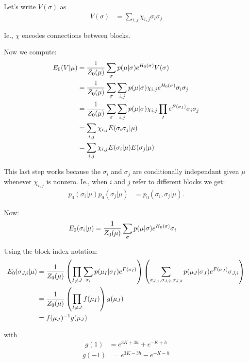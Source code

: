 \documentclass[11pt]{article}
\begin{document}
Let's write $V(\sigma)$ as
\begin{align*}
V(\sigma) &= \sum_{i,j} \chi_{i,j}\sigma_{i}\sigma_{j}
\end{align*}

Ie., $\chi$ encodes connections between blocks.

Now we compute:
\begin{align*}
E_{0}(V | \mu) &= {{1} \over {Z_{0}(\mu)}}\sum_{\sigma} p(\mu | \sigma)e^{H_{0}(\sigma)}V(\sigma)\\
 &= {{1} \over {Z_{0}(\mu)}}\sum_{\sigma} \sum_{i,j} p(\mu | \sigma)\chi_{i,j}e^{H_{0}(\sigma)}\sigma_{i}\sigma_{j}\\
 &= {{1} \over {Z_{0}(\mu)}}\sum_{\sigma} \sum_{i,j} p(\mu | \sigma)\chi_{i,j}\prod_{I} e^{F(\sigma_{I})}\sigma_{i}\sigma_{j}\\
 &= \sum_{i,j} \chi_{i,j}E(\sigma_{i}\sigma_{j} | \mu)\\
 &= \sum_{i,j} \chi_{i,j}E(\sigma_{i} | \mu)E(\sigma_{j} | \mu)
\end{align*}

This last step works because the $\sigma_i$ and $\sigma_j$ are
conditionally independant given $\mu$ whenever $\chi_{i, j}$ is
nonzero. Ie., when $i$ and $j$ refer to different blocks we get:
\begin{align*}
p_{0}(\sigma_{i} | \mu)p_{0}(\sigma_{j} | \mu) &= p_{0}(\sigma_{i}, \sigma_{j} | \mu).
\end{align*}

Now:
\begin{align*}
E_{0}(\sigma_{i} | \mu) &= {{1} \over {Z_{0}(\mu)}}\sum_{\sigma} p(\mu | \sigma)e^{H_{0}(\sigma)}\sigma_{i}
\end{align*}

Using the block index notation:
\begin{align*}
E_{0}(\sigma_{J,i} | \mu) &= {{1} \over {Z_{0}(\mu)}}\left({\prod_{I \not = J} \sum_{\sigma_{i}} p(\mu_{I} | \sigma_{I})e^{F(\sigma_{I})}}\right)\left({\sum_{\sigma_{J,1},\sigma_{J,2},\sigma_{J,3}} p(\mu_{J} | \sigma_{J})e^{F(\sigma_{J})}\sigma_{J,i}}\right)\\
 &= {{1} \over {Z_{0}(\mu)}}\left({\prod_{I \not = J} f(\mu_{I})}\right)g(\mu_{J})\\
 &= f(\mu_{J})^{-1}g(\mu_{J})
\end{align*}

with
\begin{align*}
g(1) &= e^{3K+3h}+e^{-K+h}
\end{align*}
\begin{align*}
g(-1) &= e^{3K-3h}-e^{-K-h}
\end{align*}
\end{document}
